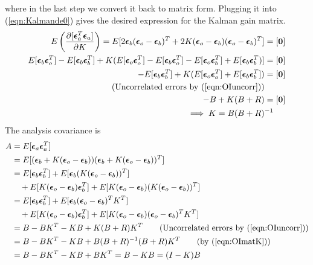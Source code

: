 where in the last step we convert it back to matrix form. Plugging it into (\ref{eqn:Kalmande0}) gives the desired expression for the Kalman gain matrix.
\begin{align}
E\left(\frac{\partial [\bm{\epsilon}_a^T\bm{\epsilon}_a]}{\partial K}\right) = E[2 \bm{\epsilon}_b (\bm{\epsilon}_o - \bm{\epsilon}_b)^T + 2K(\bm{\epsilon}_o - \bm{\epsilon}_b)(\bm{\epsilon}_o - \bm{\epsilon}_b)^T] &= [\textbf{0}] \nonumber \\
E[\bm{\epsilon}_b\bm{\epsilon}_o^T] - E[\bm{\epsilon}_b\bm{\epsilon}_b^T] + K(E[\bm{\epsilon}_o\bm{\epsilon}_o^T] - E[\bm{\epsilon}_b\bm{\epsilon}_o^T] - E[\bm{\epsilon}_o\bm{\epsilon}_b^T] + E[\bm{\epsilon}_b\bm{\epsilon}_b^T)] &= [\textbf{0}] \nonumber \\
- E[\bm{\epsilon}_b\bm{\epsilon}_b^T] + K(E[\bm{\epsilon}_o\bm{\epsilon}_o^T] + E[\bm{\epsilon}_b\bm{\epsilon}_b^T]) &= [\textbf{0}] \nonumber \\
\text{(Uncorrelated errors by (\ref{eqn:OIuncorr}))} & \nonumber \\
- B + K(B+R) &= [\textbf{0}] \nonumber \\
\implies K = B(B+R)&^{-1} \label{eqn:OImatK}
\end{align}
The analysis covariance is
\begin{align}
A &= E[\bm{\epsilon}_a\bm{\epsilon}_a^T] \nonumber \\
&= E[(\bm{\epsilon}_b + K(\bm{\epsilon}_o - \bm{\epsilon}_b))(\bm{\epsilon}_b + K(\bm{\epsilon}_o - \bm{\epsilon}_b))^T] \nonumber \\
&= E[\bm{\epsilon}_b\bm{\epsilon}_b^T] + E[\bm{\epsilon}_b(K(\bm{\epsilon}_o - \bm{\epsilon}_b))^T] \nonumber \\
&\quad + E[K(\bm{\epsilon}_o - \bm{\epsilon}_b)\bm{\epsilon}_b^T] + E[K(\bm{\epsilon}_o - \bm{\epsilon}_b)(K(\bm{\epsilon}_o - \bm{\epsilon}_b))^T] \nonumber \\
&= E[\bm{\epsilon}_b\bm{\epsilon}_b^T] + E[\bm{\epsilon}_b(\bm{\epsilon}_o - \bm{\epsilon}_b)^TK^T] \nonumber \\
&\quad + E[K(\bm{\epsilon}_o - \bm{\epsilon}_b)\bm{\epsilon}_b^T] + E[K(\bm{\epsilon}_o - \bm{\epsilon}_b) (\bm{\epsilon}_o - \bm{\epsilon}_b)^TK^T] \nonumber \\
&= B - BK^T - KB + K(B+R)K^T \qquad \text{(Uncorrelated errors by (\ref{eqn:OIuncorr}))} \nonumber \\
&= B - BK^T - KB + B(B+R)^{-1} (B+R)K^T \qquad \text{(by (\ref{eqn:OImatK}))} \nonumber \\
&= B - BK^T - KB + BK^T = B - KB = (I-K)B \label{eqn:OIAnalysis}
\end{align}
